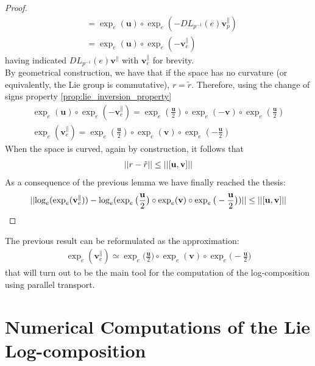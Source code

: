 \begin{proof}
\begin{align*}
		&= \exp_{e}(\mathbf{u})\circ\exp_{e}(-DL_{p^{-1}}(e)\mathbf{v}_{p}^{\parallel}) \\
		&= \exp_{e}(\mathbf{u})\circ \exp_{e}(-\mathbf{v}_{e}^{\parallel})
	\end{align*}
	having indicated $DL_{p^{-1}}(e)\mathbf{v}^{\parallel}$ with $\mathbf{v}_{e}^{\parallel}$ for brevity.\\
	By geometrical construction, we have that if the space has no curvature (or equivalently, the Lie group is commutative), $r=\tilde{r}$. Therefore, using the change of signs property \ref{prop:lie_inversion_property}
	\begin{align*}
		\exp_{e}(\mathbf{u})\circ \exp_{e}(-\mathbf{v}_{e}^{\parallel})
		=
		\exp_{e}(\frac{\mathbf{u}}{2})\circ \exp_{e}(-\mathbf{v})\circ\exp_{e}(\frac{\mathbf{u}}{2})
		\\
		\exp_{e}(\mathbf{v}_{e}^{\parallel})
		=
		\exp_{e}(\frac{\mathbf{u}}{2})\circ \exp_{e}(\mathbf{v})\circ\exp_{e}(-\frac{\mathbf{u}}{2})
	\end{align*}
	When the space is curved, again by construction, it follows that
	\begin{align*}
		\vert\lvert r-\tilde{r} \rvert\vert \leq \vert\lvert [\mathbf{u},\mathbf{v}] \rvert\vert
	\end{align*}
	As a consequence of the previous lemma we have finally reached the thesis:
	\begin{align*}
		\vert\lvert 
			\log_{e}(\exp_{e}(\mathbf{v}_{e}^{\parallel} ))
			-
			\log_{e}(\exp_{e}\big(\frac{\mathbf{u}}{2}\big)   
			\circ  \exp_{e}(\mathbf{v}) 
			\circ \exp_{e}\big(-\frac{\mathbf{u}}{2}\big))
		 \rvert\vert 
		\leq
		\vert\lvert [\mathbf{u}, \mathbf{v}] \rvert\vert
	\end{align*}
\end{proof} 

The previous result can be reformulated as the approximation:
\begin{align}\label{eq:parallel_transport_main_approximation}
\exp_{e}(\mathbf{v}_{e}^{\parallel}) 
\simeq
\exp_{e}\big(\frac{\mathbf{u}}{2}\big)   
\circ  \exp_{e}(\mathbf{v}) 
\circ \exp_{e}\big(-\frac{\mathbf{u}}{2}\big)
\end{align}
that will turn out to be the main tool for the computation of the log-composition using parallel transport.


\section{Numerical Computations of the Lie Log-composition}

